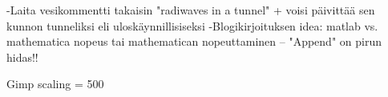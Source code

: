 -Laita vesikommentti takaisin "radiwaves in a tunnel" + voisi päivittää sen kunnon tunneliksi eli uloskäynnillisiseksi
-Blogikirjoituksen idea: matlab vs. mathematica nopeus tai mathematican nopeuttaminen – "Append" on pirun hidas!!

Gimp scaling = 500 
